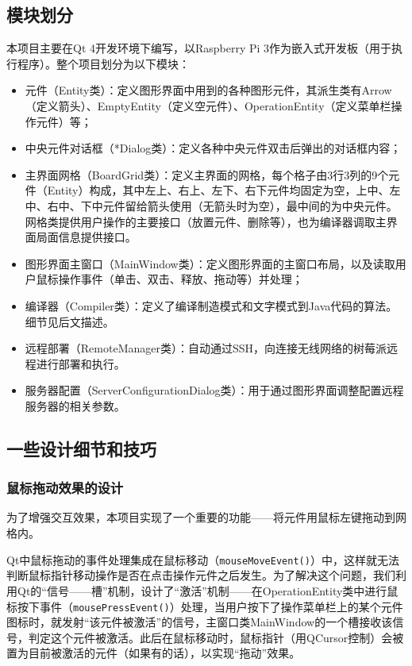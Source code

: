 \documentclass[UTF8]{ctexart}
\begin{document}
\subsection{模块划分}
本项目主要在Qt 4开发环境下编写，以Raspberry Pi 3作为嵌入式开发板（用于执行程序）。整个项目划分为以下模块：
\begin{itemize}
	\item 元件（Entity类）：定义图形界面中用到的各种图形元件，其派生类有Arrow（定义箭头）、EmptyEntity（定义空元件）、OperationEntity（定义菜单栏操作元件）等；
	\item 中央元件对话框（*Dialog类）：定义各种中央元件双击后弹出的对话框内容；
	\item 主界面网格（BoardGrid类）：定义主界面的网格，每个格子由3行3列的9个元件（Entity）构成，其中左上、右上、左下、右下元件均固定为空，上中、左中、右中、下中元件留给箭头使用（无箭头时为空），最中间的为中央元件。网格类提供用户操作的主要接口（放置元件、删除等），也为编译器调取主界面局面信息提供接口。
	\item 图形界面主窗口（MainWindow类）：定义图形界面的主窗口布局，以及读取用户鼠标操作事件（单击、双击、释放、拖动等）并处理；
	\item 编译器（Compiler类）：定义了编译制造模式和文字模式到Java代码的算法。细节见后文描述。
	\item 远程部署（RemoteManager类）：自动通过SSH，向连接无线网络的树莓派远程进行部署和执行。
	\item 服务器配置（ServerConfigurationDialog类）：用于通过图形界面调整配置远程服务器的相关参数。
\end{itemize}

\subsection{一些设计细节和技巧}
\subsubsection{鼠标拖动效果的设计}
为了增强交互效果，本项目实现了一个重要的功能——将元件用鼠标左键拖动到网格内。\par
Qt中鼠标拖动的事件处理集成在鼠标移动（\texttt{mouseMoveEvent()}）中，这样就无法判断鼠标指针移动操作是否在点击操作元件之后发生。为了解决这个问题，我们利用Qt的“信号——槽”机制，设计了“激活”机制——在OperationEntity类中进行鼠标按下事件（\texttt{mousePressEvent()}）处理，当用户按下了操作菜单栏上的某个元件图标时，就发射“该元件被激活”的信号，主窗口类MainWindow的一个槽接收该信号，判定这个元件被激活。此后在鼠标移动时，鼠标指针（用QCursor控制）会被置为目前被激活的元件（如果有的话），以实现“拖动”效果。\par
\end{document}
